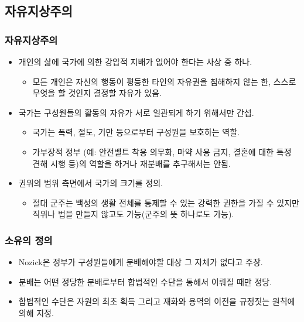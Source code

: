 \documentclass[aspectratio=169,xcolor=dvipsnames,handout]{beamer}
\begin{document}
\subsection{자유지상주의}%
\begin{frame}[<+->]
\frametitle{자유지상주의}
    \begin{itemize}
        \item 개인의 삶에 국가에 의한 강압적 지배가 없어야 한다는 사상 중 하나.
        \begin{itemize}
            \item 모든 개인은 자신의 행동이 평등한 타인의 자유권을 침해하지 않는 한, 스스로 무엇을 할 것인지 결정할 자유가 있음.
        \end{itemize}
        \item 국가는 구성원들의 활동의 자유가 서로 일관되게 하기 위해서만 간섭.
        \begin{itemize}
            \item 국가는 폭력, 절도, 기만 등으로부터 구성원을 보호하는 역할.
            \item 가부장적 정부 (예: 안전벨트 착용 의무화, 마약 사용 금지, 결혼에 대한 특정 견해 시행 등)의 역할을 하거나 재분배를 추구해서는 안됨.
        \end{itemize}
        \item 권위의 범위 측면에서 국가의 크기를 정의.
        \begin{itemize}
            \item 절대 군주는 백성의 생활 전체를 통제할 수 있는 강력한 권한을 가질 수 있지만 직위나 법을 만들지 않고도 가능(군주의 뜻 하나로도 가능).
        \end{itemize}
    \end{itemize}
\end{frame}

\begin{frame}[<+->]
\frametitle{소유의 정의}
    \begin{itemize}
        \item Nozick은 정부가 구성원들에게 분배해야할 대상 그 자체가 없다고 주장.
        \item 분배는 어떤 정당한 분배로부터 합법적인 수단을 통해서 이뤄질 때만 정당.
        \item 합법적인 수단은 자원의 최초 획득 그리고 재화와 용역의 이전을 규정짓는 원칙에 의해 지정.
    \end{itemize}
\end{frame}
\end{document}

